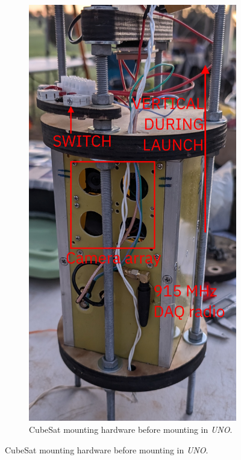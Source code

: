 \documentclass[]{report}
\begin{document}
\begin{figure}[H]
  \begin{subfigure}{0.495\textwidth}
    \centering
    \includegraphics[width=\linewidth]{images/cubesat-payload-bay.jpg}
    \caption{CubeSat mounting hardware before mounting in \textit{UNO}.}

\end{subfigure}
\end{figure}
\end{document}
